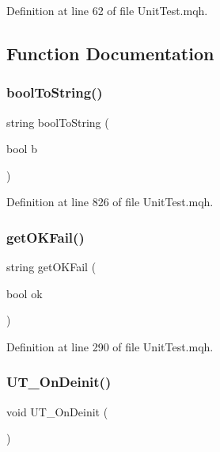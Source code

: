 Definition at line 62 of file Unit\+Test.\+mqh.



\subsection{Function Documentation}
\mbox{\label{_unit_test_8mqh_a846b4d0b246628bc40f57371459bdf2f}} 
\subsubsection{\texorpdfstring{bool\+To\+String()}{boolToString()}}
{\footnotesize\ttfamily string bool\+To\+String (\begin{DoxyParamCaption}\item[{bool}]{b }\end{DoxyParamCaption})}



Definition at line 826 of file Unit\+Test.\+mqh.

\mbox{\label{_unit_test_8mqh_a560d9b8bdbe896abd079b6c9d7bd107f}} 
\subsubsection{\texorpdfstring{get\+O\+K\+Fail()}{getOKFail()}}
{\footnotesize\ttfamily string get\+O\+K\+Fail (\begin{DoxyParamCaption}\item[{bool}]{ok }\end{DoxyParamCaption})}



Definition at line 290 of file Unit\+Test.\+mqh.

\mbox{\label{_unit_test_8mqh_a9fbaaa20ba4e1624e348f7ab5109ecbf}} 
\subsubsection{\texorpdfstring{U\+T\+\_\+\+On\+Deinit()}{UT\_OnDeinit()}}
{\footnotesize\ttfamily void U\+T\+\_\+\+On\+Deinit (\begin{DoxyParamCaption}{ }\end{DoxyParamCaption})}



